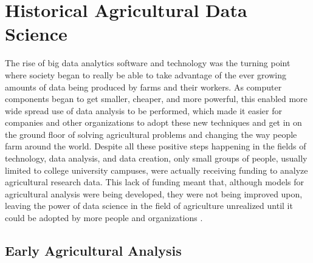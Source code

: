 \documentclass[sigconf]{acmart}
\begin{document}
\section{Historical Agricultural Data Science}

The rise of big data analytics software and technology was the turning point where society began to really be able to take advantage of the ever growing amounts of data being produced by farms and their workers. As computer components began to get smaller, cheaper, and more powerful, this enabled more wide spread use of data analysis to be performed, which made it easier for companies and other organizations to adopt these new techniques and get in on the ground floor of solving agricultural problems and changing the way people farm around the world. Despite all these positive steps happening in the fields of technology, data analysis, and data creation, only small groups of people, usually limited to college university campuses, were actually receiving funding to analyze agricultural research data. This lack of funding meant that, although models for agricultural analysis were being developed, they were not being improved upon, leaving the power of data science in the field of agriculture unrealized until it could be adopted by more people and organizations \cite{jones2017}. 

\subsection{Early Agricultural Analysis}
\end{document}
